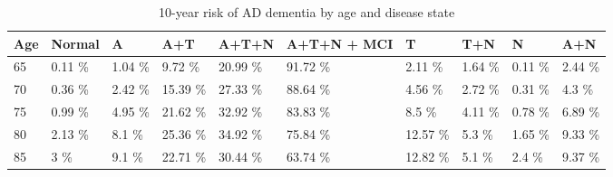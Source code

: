 \begin{table}[ht]
\centering
\begin{tabular}{llllllllll}
  \hline
Age & Normal & A & A+T & A+T+N & A+T+N + MCI & T & T+N & N & A+N \\ 
  \hline
65 & 0.11 \% & 1.04 \% & 9.72 \% & 20.99 \% & 91.72 \% & 2.11 \% & 1.64 \% & 0.11 \% & 2.44 \% \\ 
  70 & 0.36 \% & 2.42 \% & 15.39 \% & 27.33 \% & 88.64 \% & 4.56 \% & 2.72 \% & 0.31 \% & 4.3 \% \\ 
  75 & 0.99 \% & 4.95 \% & 21.62 \% & 32.92 \% & 83.83 \% & 8.5 \% & 4.11 \% & 0.78 \% & 6.89 \% \\ 
  80 & 2.13 \% & 8.1 \% & 25.36 \% & 34.92 \% & 75.84 \% & 12.57 \% & 5.3 \% & 1.65 \% & 9.33 \% \\ 
  85 & 3 \% & 9.1 \% & 22.71 \% & 30.44 \% & 63.74 \% & 12.82 \% & 5.1 \% & 2.4 \% & 9.37 \% \\ 
   \hline
\end{tabular}
\caption{10-year risk of AD dementia by age and disease state} 
\end{table}
